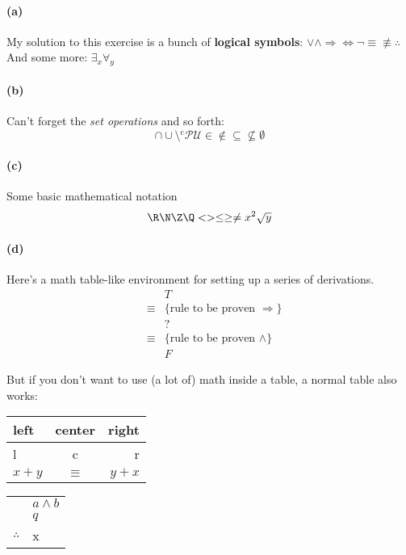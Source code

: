 \documentclass[a4paper,twoside,11pt]{article}
\begin{document}
\paragraph{(a)} 
My solution to this exercise is a bunch of \textbf{logical symbols}:
$\vee \wedge \Rightarrow \Leftrightarrow \neg \equiv \not\equiv \therefore$\\
And some more: $\exists_x \forall_y$

\paragraph{(b)}
Can't forget the \emph{set operations} and so forth:
\[ \cap \cup \setminus {}^\text{c} \mathcal{P} \mathcal{U} \in \not\in \subseteq \not\subseteq \emptyset \]

\paragraph{(c)}
Some basic mathematical notation
\[ \R \N \Z \Q < > \leq \geq \neq x^2 \sqrt{y} \]

\paragraph{(d)}

Here's a math table-like environment for setting up a series of derivations.
\begin{eqnarray*}
  && T \\
  &\equiv& \{ \text{rule to be proven } \Rightarrow \} \\
  && ? \\
  &\equiv& \{ \text{rule to be proven } \wedge \} \\
  && F 
\end{eqnarray*}

But if you don't want to use (a lot of) math inside a table, a normal table also works:\\
\begin{tabular}{lcr}
left & center & right \\
\hline
l & c & r \\
$x+y$ & $\equiv$ & $y + x$ \\
\end{tabular}

\begin{tabular}{rl}
& $a \wedge b$ \\
& $q$ \\
\hline
$\therefore$ & x 
\end{tabular}
\end{document}
